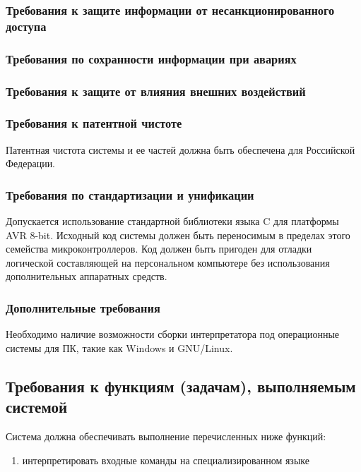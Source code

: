 \documentclass[a4paper, 12pt]{report}
\begin{document}
\subsubsection{Требования к защите информации от несанкционированного доступа}

\subsubsection{Требования по сохранности информации при авариях}

\subsubsection{Требования к защите от влияния внешних воздействий}

\subsubsection{Требования к патентной чистоте}

Патентная чистота системы и ее частей должна быть обеспечена для Российской Федерации.

\subsubsection{Требования по стандартизации и унификации}

Допускается использование стандартной библиотеки языка C для платформы AVR 8-bit.
Исходный код системы должен быть переносимым в пределах этого семейства микроконтроллеров. Код должен быть пригоден 
для отладки логической составляющей на персональном компьютере без использования дополнительных аппаратных средств.

\subsubsection{Дополнительные требования}

Необходимо наличие возможности сборки интерпретатора под операционные системы для ПК, такие как Windows и GNU/Linux.


\subsection{Требования к функциям (задачам), выполняемым системой}

Система должна обеспечивать выполнение перечисленных ниже функций:
\begin{enumerate}
	\item интерпретировать входные команды на специализированном языке
\end{enumerate}
\end{document}
